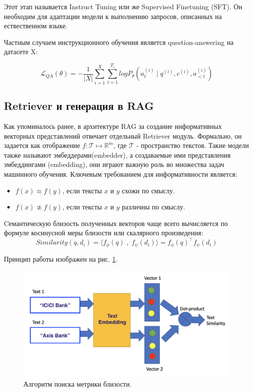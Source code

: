 Этот этап называется Instruct Tuning или же Supervised Finetuning (SFT). Он необходим для адаптации модели к выполнению запросов, описанных на ествественном языке.  

Частным случаем инструкционного обучения является question-answering на датасете X:

\begin{equation}
    \mathcal{L}_{QA}(\theta) = - \frac{1}{|X|} \sum_{i=1}^X \sum_{t=1}^{T_i} log P_{\theta}(a_t^{(i)} \mid q^{(i)}, c^{(i)} ,a_{<t}^{(i)})
\end{equation}


\subsection{Retriever и генерация в RAG}
\label{subsec:rag} 

Как упоминалось ранее, в архитектуре RAG за создание информативных векторных представлений отвечает отдельный Retriever модуль. Формально, он задается как отображение $f: \mathcal T \mapsto \mathbb{R}^m$, где $\mathcal T$ - пространство текстов. Такие модели также называют эмбеддерами(embedder), а создаваемые ими представления эмбеддингами (embedding), они играют важную роль во множества задач машинного обучения. Ключевым требованием для информативности является:

\begin{itemize}
    \item $f(x) \approx f(y)$, если тексты $x$ и $y$ схожи по смыслу.
    \item $f(x) \not\approx f(y)$, если тексты $x$ и $y$ различны по смыслу.
\end{itemize}

Cемантическую близость полученных векторов чаще всего вычисляется по формуле косинусной меры близости или скалярного произведения:
\begin{equation}
   Similarity(q, d_i) = \langle f_{\phi}(q) \; , \; f_{\psi}(d_i) \rangle = f_{\phi}(q)^{\top} f_{\psi}(d_i)
\end{equation}

Принцип работы изображен на рис. \ref{retrieval}.

\begin{figure}[h!]
    \centering
    \includegraphics[scale=0.8]{./images/embedder.png}
    \caption{\protect\hypertarget{image1}{Алгоритм поиска метрики близости.}}
    \label{retrieval}
\end{figure}

